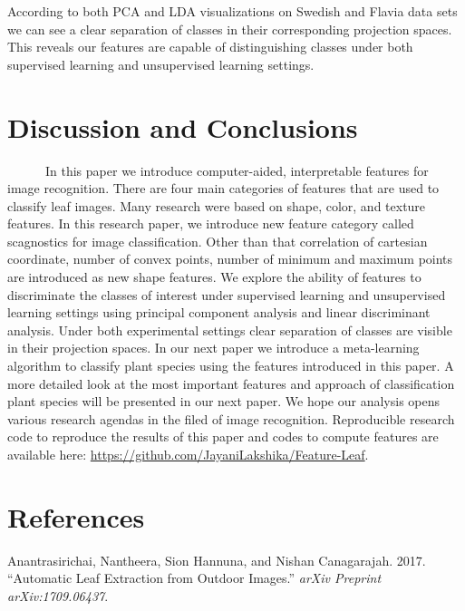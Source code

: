 \documentclass{article}
\begin{document}
According to both PCA and LDA visualizations on Swedish and Flavia data
sets we can see a clear separation of classes in their corresponding
projection spaces. This reveals our features are capable of
distinguishing classes under both supervised learning and unsupervised
learning settings.

\hypertarget{discussion-and-conclusions}{%
\section{Discussion and Conclusions}\label{discussion-and-conclusions}}

~~~~~~In this paper we introduce computer-aided, interpretable features
for image recognition. There are four main categories of features that
are used to classify leaf images. Many research were based on shape,
color, and texture features. In this research paper, we introduce new
feature category called scagnostics for image classification. Other than
that correlation of cartesian coordinate, number of convex points,
number of minimum and maximum points are introduced as new shape
features. We explore the ability of features to discriminate the classes
of interest under supervised learning and unsupervised learning settings
using principal component analysis and linear discriminant analysis.
Under both experimental settings clear separation of classes are visible
in their projection spaces. In our next paper we introduce a
meta-learning algorithm to classify plant species using the features
introduced in this paper. A more detailed look at the most important
features and approach of classification plant species will be presented
in our next paper. We hope our analysis opens various research agendas
in the filed of image recognition. Reproducible research code to
reproduce the results of this paper and codes to compute features are
available here: \url{https://github.com/JayaniLakshika/Feature-Leaf}.

\newpage

\hypertarget{references}{%
\section*{References}\label{references}}

\hypertarget{refs}{}
\leavevmode\hypertarget{ref-DBLP}{}%
Anantrasirichai, Nantheera, Sion Hannuna, and Nishan Canagarajah. 2017.
``Automatic Leaf Extraction from Outdoor Images.'' \emph{arXiv Preprint
arXiv:1709.06437}.
\end{document}
